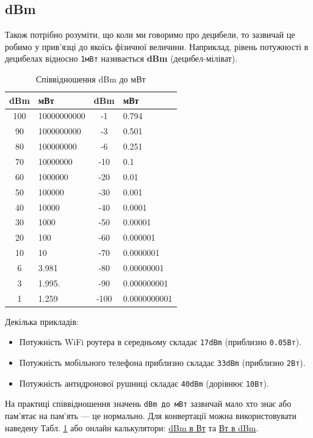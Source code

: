 \documentclass{article}
\begin{document}
\subsection{dBm}
Також потрібно розуміти, що коли ми говоримо про децибели, то зазвичай це робимо у прив'язці до якоїсь фізичної величини. Наприклад, рівень потужності в децибелах відносно \texttt{1мВт} називається \textbf{dBm} (децибел-міліват).


\begin{table}[h!]
\centering
\begin{tabular}{|c|l||c|l|}
\hline
\textbf{dBm}  & \textbf{мВт} & \textbf{dBm} & \textbf{мВт} \\
\hline
100  & 10000000000  &  -1  & 0.794 \\
90   & 1000000000   &  -3  & 0.501  \\
80   & 100000000    &  -6  & 0.251  \\
70   & 10000000     & -10  & 0.1 \\
60   & 1000000      & -20  & 0.01 \\
50   & 100000       & -30  & 0.001 \\
40   & 10000        & -40  & 0.0001 \\
30   & 1000         & -50  & 0.00001 \\
20   & 100          & -60  & 0.000001 \\
10   & 10           & -70  & 0.0000001 \\
 6   & 3.981        & -80  & 0.00000001 \\
 3   & 1.995.       & -90  & 0.000000001 \\
 1   & 1.259        & -100 & 0.0000000001 \\
\hline
\end{tabular}
\caption{\label{table:dbm2mwatts}Співвідношення dBm до мВт}
\end{table}

Декілька прикладів:
\begin{itemize}[noitemsep, topsep=8pt]
\item Потужність WiFi роутера в середньому складає \texttt{17dBm} (приблизно \texttt{0.05Вт}).
\item Потужність мобільного телефона приблизно складає \texttt{33dBm} (приблизно \texttt{2Вт}).
\item Потужність антидронової рушниці складає \texttt{40dBm} (дорівнює \texttt{10Вт}).
\end{itemize}

На практиці співвідношення значень \texttt{dBm до мВт} зазвичай мало хто знає або пам'ятає на пам'ять --- це нормально. Для конвертації можна використовувати наведену Табл. \ref{table:dbm2mwatts} або онлайн калькулятори: \href{https://www.everythingrf.com/rf-calculators/dbm-to-watts}{dBm в Вт} та \href{https://www.everythingrf.com/rf-calculators/watt-to-dbm}{Вт в dBm}.
\end{document}
